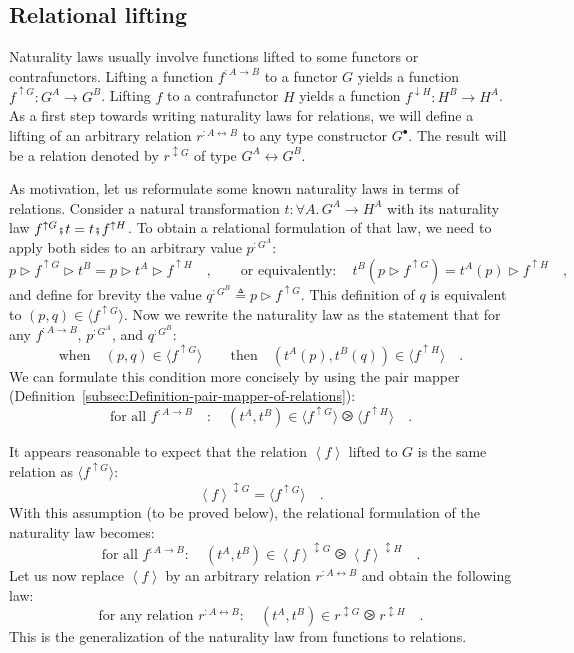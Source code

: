 \subsection{Relational lifting}

Naturality laws usually involve functions lifted to some functors
or contrafunctors. Lifting a function $f^{:A\rightarrow B}$ to a
functor $G$ yields a function $f^{\uparrow G}:G^{A}\rightarrow G^{B}$.
Lifting $f$ to a contrafunctor $H$ yields a function $f^{\downarrow H}:H^{B}\rightarrow H^{A}$.
As a first step towards writing naturality laws for relations, we
will define a lifting of an arbitrary relation $r^{:A\leftrightarrow B}$
to any type constructor $G^{\bullet}$. The result will be a relation
denoted by $r^{\updownarrow G}$ of type $G^{A}\leftrightarrow G^{B}$.

As motivation, let us reformulate some known naturality laws in terms
of relations. Consider a natural transformation $t:\forall A.\,G^{A}\rightarrow H^{A}$
with its naturality law $f^{\uparrow G}\bef t=t\bef f^{\uparrow H}$.
To obtain a relational formulation of that law, we need to apply both
sides to an arbitrary value $p^{:G^{A}}$:
\[
p\triangleright f^{\uparrow G}\triangleright t^{B}=p\triangleright t^{A}\triangleright f^{\uparrow H}\quad,\quad\quad\text{or equivalently}:\quad t^{B}(p\triangleright f^{\uparrow G})=t^{A}(p)\triangleright f^{\uparrow H}\quad,
\]
and define for brevity the value $q^{:G^{B}}\triangleq p\triangleright f^{\uparrow G}$.
This definition of $q$ is equivalent to $(p,q)\in\langle f^{\uparrow G}\rangle$.
Now we rewrite the naturality law as the statement that for any $f^{:A\rightarrow B}$,
$p^{:G^{A}}$, and $q^{:G^{B}}$:
\[
\text{when}\quad(p,q)\in\langle f^{\uparrow G}\rangle\quad\quad\text{then}\quad(t^{A}(p),t^{B}(q))\in\langle f^{\uparrow H}\rangle\quad.
\]
We can formulate this condition more concisely by using the pair mapper
(Definition~\ref{subsec:Definition-pair-mapper-of-relations}):
\[
\text{for all }f^{:A\rightarrow B}\quad:\quad(t^{A},t^{B})\in\langle f^{\uparrow G}\rangle\ogreaterthan\langle f^{\uparrow H}\rangle\quad.
\]

It appears reasonable to expect that the relation $\left<f\right>$
lifted to $G$ is the same relation as $\langle f^{\uparrow G}\rangle$:
\[
\left<f\right>^{\updownarrow G}=\langle f^{\uparrow G}\rangle\quad.
\]
With this assumption (to be proved below), the relational formulation
of the naturality law becomes:
\[
\text{for all }f^{:A\rightarrow B}:\quad(t^{A},t^{B})\in\left<f\right>^{\updownarrow G}\ogreaterthan\left<f\right>^{\updownarrow H}\quad.
\]
Let us now replace $\left<f\right>$ by an arbitrary relation $r^{:A\leftrightarrow B}$
and obtain the following law:
\[
\text{for any relation }r^{:A\leftrightarrow B}:\quad(t^{A},t^{B})\in r^{\updownarrow G}\ogreaterthan r^{\updownarrow H}\quad.
\]
This is the generalization of the naturality law from functions to
relations. 

